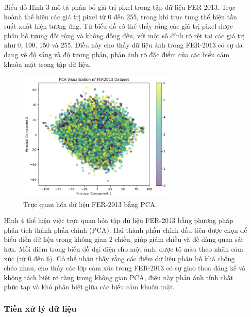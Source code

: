 Biểu đồ Hình 3 mô tả phân bố giá trị pixel trong tập dữ liệu FER-2013. Trục hoành thể hiện các giá trị pixel từ 0 đến 255, trong khi trục tung thể hiện tần suất xuất hiện tương ứng. Từ biểu đồ có thể thấy rằng các giá trị pixel được phân bố tương đối rộng và không đồng đều, với một số đỉnh rõ rệt tại các giá trị như 0, 100, 150 và 255. Điều này cho thấy dữ liệu ảnh trong FER-2013 có sự đa dạng về độ sáng và độ tương phản, phản ánh rõ đặc điểm của các biểu cảm khuôn mặt trong tập dữ liệu.

\begin{figure}[H]
    \centering
    \includegraphics[width=0.7\textwidth]{img/PCA.png} %
    \caption{Trực quan hóa dữ liệu FER-2013 bằng PCA.}
    \label{fig:pca_visualization}
    \par\vspace{0.5cm} %
\end{figure}

Hình 4 thể hiện việc trực quan hóa tập dữ liệu FER-2013 bằng phương pháp phân tích thành phần chính (PCA). Hai thành phần chính đầu tiên được chọn để biểu diễn dữ liệu trong không gian 2 chiều, giúp giảm chiều và dễ dàng quan sát hơn. Mỗi điểm trong biểu đồ đại diện cho một ảnh, được tô màu theo nhãn cảm xúc (từ 0 đến 6). Có thể nhận thấy rằng các điểm dữ liệu phân bố khá chồng chéo nhau, cho thấy các lớp cảm xúc trong FER-2013 có sự giao thoa đáng kể và không tách biệt rõ ràng trong không gian PCA, điều này phản ánh tính chất phức tạp và khó phân biệt giữa các biểu cảm khuôn mặt.


\subsubsection{Tiền xử lý dữ liệu}

